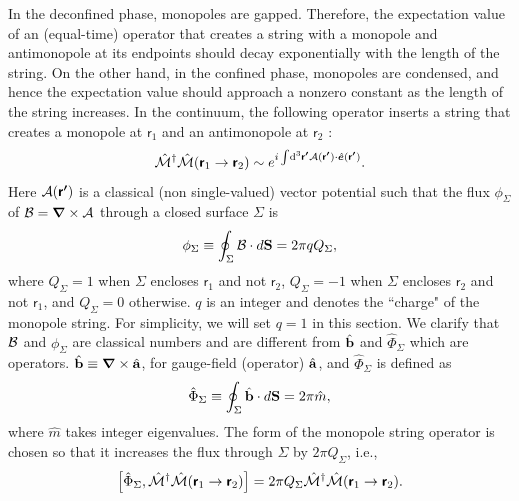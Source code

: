 \documentclass[twocolumn,superscriptaddress,amsmath,amssymb,aps,prx,nofootinbib]{revtex4-2}
\newcommand{\dual}[1]{\boldsymbol{\mathsf{#1}}}
\begin{document}
In the deconfined phase, monopoles are gapped. Therefore, the expectation value of an (equal-time) operator that creates a string with a monopole and antimonopole at its endpoints should decay exponentially with the length of the string. On the other hand, in the confined phase, monopoles are condensed, and hence the expectation value should approach a nonzero constant as the length of the string increases. In the continuum, the following operator inserts a string that creates a monopole at $\dual{r}_1$ and an antimonopole at $\dual{r}_2$ \cite{hermele2004}:
\begin{equation}\label{eq:monopolestring}
    \hat{\mathcal{M}}^\dagger \hat{\mathcal{M}} (\dual{r}_1 \rightarrow \dual{r}_2)\sim e^{i\int \dd[3]{\dual{r'}}\vb{\mathcal{A}}(\dual{r'})\cdot \hat{\boldsymbol{e}}(\dual{r'})}. 
\end{equation}
Here $\vb{\mathcal{A}}(\dual{r'})$ is a classical (non single-valued) vector potential such that the flux $\phi_{\Sigma}$ of $\vb{\mathcal{B}}=\grad \times \vb{\mathcal{A}}$ through a closed surface $\Sigma$ is 
\begin{equation}\label{eq:fluxcondition}
    \phi_{\Sigma}\equiv \oint_{\Sigma} \vb{\mathcal{B}}\cdot d\vb{S}=2\pi q Q_{\Sigma},
\end{equation}
where $Q_{\Sigma}=1$ when $\Sigma$ encloses $\dual{r}_1$ and not $\dual{r}_2$, $Q_{\Sigma}=-1$ when $\Sigma$ encloses $\dual{r}_2$ and not $\dual{r}_1$, and $Q_{\Sigma}=0$ otherwise. $q$ is an integer and denotes the ``charge" of the monopole string.  For simplicity, we will set $q=1$ in this section. We clarify that $\vb{\mathcal{B}}$ and $\phi_\Sigma$ are classical numbers and are different from $\hat{\vb{b}}$ and $\hat{\Phi}_{\Sigma}$ which are operators. $\hat{\vb{b}}\equiv \grad \times \hat{\vb{a}}$, for gauge-field (operator) $\hat{\vb{a}}$, and $\hat{\Phi}_{\Sigma}$ is defined as
\begin{equation}
    \hat{\Phi}_{\Sigma}\equiv \oint_{\Sigma} \hat{\vb{b}}\cdot d\vb{S}=2\pi \hat{m},
\end{equation}
where $\hat{m}$ takes integer eigenvalues.
The form of the monopole string operator is chosen so that it increases the flux through $\Sigma$ by $2 \pi Q_\Sigma$, i.e.,
\begin{equation}
    \comm{\hat{\Phi}_{\Sigma}}{\hat{\mathcal{M}}^\dagger \hat{\mathcal{M}} (\dual{r}_1 \rightarrow \dual{r}_2)}=2\pi Q_{\Sigma} \hat{\mathcal{M}}^\dagger \hat{\mathcal{M}}(\dual{r}_1 \rightarrow \dual{r}_2).
\end{equation}
\end{document}

